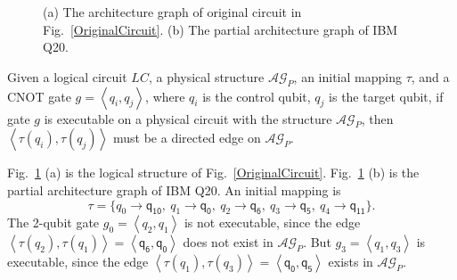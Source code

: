\documentclass[runningheads]{llncs}
\begin{document}
\begin{figure}[t]
\begin{center}
{
			}
\end{center}
	
	\caption{(a) The architecture graph of original circuit in Fig.~\ref{OriginalCircuit}. (b) The partial architecture graph of IBM Q20.}
	\label{LAGPAG}
\end{figure}
	

Given a logical circuit $LC$, a physical structure $\mathcal{AG}_{P}$, an initial mapping $\tau$, and a CNOT gate $g=\left \langle \textit{q}_\textit{i},\textit{q}_\textit{j}\right \rangle $, where $\textit{q}_\textit{i}$ is the control qubit, $\textit{q}_\textit{j}$ is the target qubit,
if gate $g$ is executable on a physical circuit with the structure $\mathcal{AG}_{P}$, then
$\left \langle\tau(\textit{q}_\textit{i}),\tau(\textit{q}_\textit{j})\right \rangle $ 
must be a directed edge on $\mathcal{AG}_{P}$.

\begin{example}
	Fig.~\ref{LAGPAG} (a) is the logical structure of Fig.~\ref{OriginalCircuit}. 
	Fig.~\ref{LAGPAG} (b) is the partial architecture graph of IBM Q20. An initial mapping is 
	$$\tau=\{\textit{q}_\textit{0}\rightarrow  \textsf{q}_{\textsf{10}},\ \textit{q}_\textit{1}\rightarrow \textsf{q}_{\textsf{0}},\ 
	\textit{q}_\textit{2}\rightarrow  \textsf{q}_{\textsf{6}},\ \textit{q}_\textit{3}\rightarrow  \textsf{q}_{\textsf{5}},\ \textit{q}_\textit{4}\rightarrow  \textsf{q}_{\textsf{11}}\} .$$
The 2-qubit gate	$g_{0}=\left \langle \textit{q}_\textit{2},\textit{q}_\textit{1}\right \rangle $ is not executable, since the edge $\left \langle \tau(\textit{q}_\textit{2}),\tau(\textit{q}_\textit{1})\right \rangle =\left \langle \textsf{q}_{\textsf{6}},\textsf{q}_{\textsf{0}}\right \rangle $ does not exist in $\mathcal{AG}_{P}$.
	But $g_{3}=\left \langle \textit{q}_\textit{1},\textit{q}_\textit{3}\right \rangle $ is executable, since 
	the edge $\left \langle \tau(\textit{q}_\textit{1}),\tau(\textit{q}_\textit{3})\right \rangle =\left \langle \textsf{q}_{\textsf{0}},\textsf{q}_{\textsf{5}}\right \rangle $  exists in $\mathcal{AG}_{P}$.
\end{example}
\end{document}
